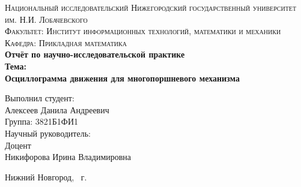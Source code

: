 \begin{titlepage}
    \begin{center}
        \large
        \textsc{Национальный исследовательский Нижегородский государственный университет им. Н.И. Лобачевского}\\[5mm]
        \textsc{Факультет: Институт информационных технологий, математики и механики}\\[2mm]
        \textsc{Кафедра: Прикладная математика}\\[40mm]

        \textbf{\Large Отчёт по научно-исследовательской практике}\\[15mm]
        \textbf{\LARGE Тема:}\\[5mm]
        \textbf{\LARGE Осциллограмма движения для многопоршневого механизма}\\[50mm]

    \end{center}

    \begin{flushright}
        \begin{minipage}{.5\textwidth}
            \large
            Выполнил студент:\\[2mm]
            Алексеев Данила Андреевич\\[1mm]
            Группа: 3821Б1ФИ1\\[5mm]

            Научный руководитель:\\[2mm]
            Доцент\\[1mm]
            Никифорова Ирина Владимировна
        \end{minipage}
    \end{flushright}

    \vfill

    \begin{center}
        \large
        Нижний Новгород, \the\year\ г.
    \end{center}
\end{titlepage}